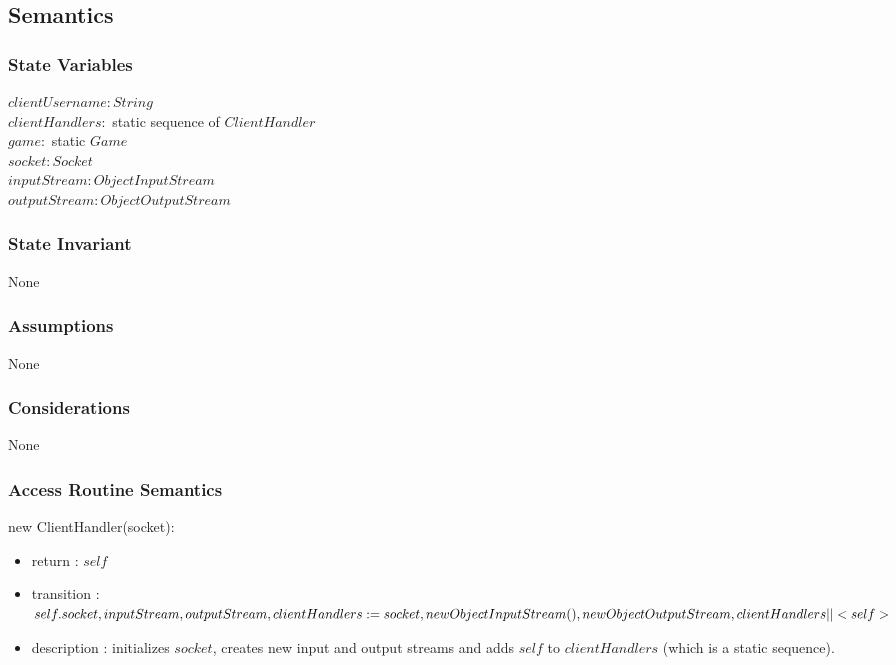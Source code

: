 \documentclass[12pt, titlepage]{article}
\begin{document}
    \subsection* {Semantics}
    
    \subsubsection* {State Variables}
        $\mathit{clientUsername}: String$\\
        $\mathit{clientHandlers}:$ static sequence of $ClientHandler$\\
        $\mathit{game}:$ static $Game$\\
        $\mathit{socket}: Socket$\\
        $\mathit{inputStream}: ObjectInputStream$\\
        $\mathit{outputStream} : ObjectOutputStream$\\

    \subsubsection* {State Invariant}
        None
    
    \subsubsection* {Assumptions}
        None
    
    \subsubsection* {Considerations}
        None
    
    \subsubsection* {Access Routine Semantics}
    
        \noindent new ClientHandler(socket):
        \begin{itemize}
        \item return : $self$
        \item transition : $self.socket, inputStream, outputStream, clientHandlers := \\
        socket, new ObjectInputStream(), new ObjectOutputStream, clientHandlers || <self>$
        \item description : initializes $socket$, creates new input and output streams and adds $self$ to $clientHandlers$ (which is a static sequence).
        \end{itemize}
        
\end{document}
